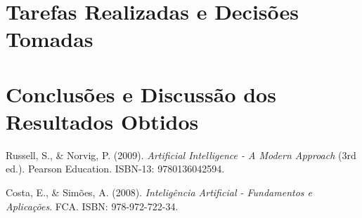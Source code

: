 \documentclass[a4paper,12pt]{scrreprt}
\begin{document}


\chapter{Tarefas Realizadas e Decisões Tomadas}



\chapter{Conclusões e Discussão dos Resultados Obtidos}





\renewcommand\bibname{Referências}

\begin{thebibliography}{9}

Russell, S., \& Norvig, P. (2009). \textit{Artificial Intelligence - A Modern Approach} (3rd ed.). Pearson Education. ISBN-13: 9780136042594.

Costa, E., \& Simões, A. (2008). \textit{Inteligência Artificial - Fundamentos e Aplicações}. FCA. ISBN: 978-972-722-34.

\end{thebibliography}


\end{document}
